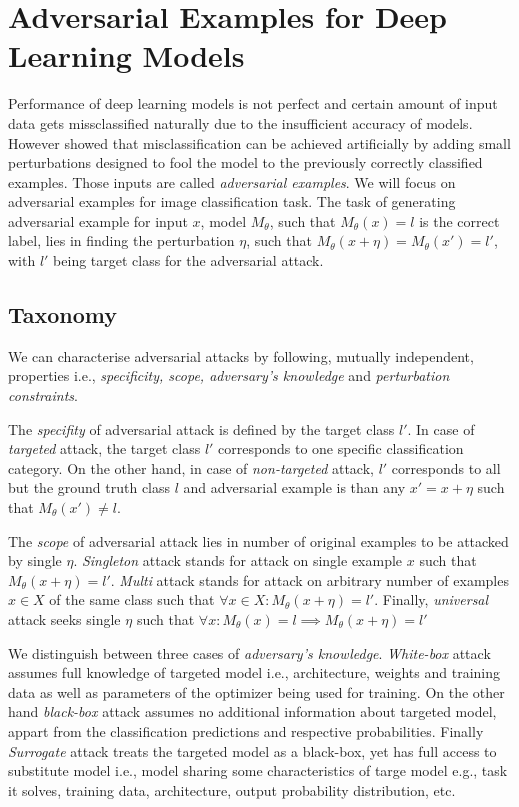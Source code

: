 \chapter{Adversarial Examples for Deep Learning Models}
\label{sec:advex}
Performance of deep learning models is not perfect and certain amount of input data gets missclassified naturally due to the insufficient accuracy of models. However \cite{DBLP:journals/corr/SzegedyZSBEGF13} showed that misclassification can be achieved artificially by adding small perturbations designed to fool the model to the previously correctly classified examples. Those inputs are called \emph{adversarial examples}. We will focus on adversarial examples for image classification task.
The task of generating adversarial example for input $x$, model $M_\theta$, such that $M_\theta(x) = l$ is the correct label, lies in finding the perturbation $\eta$, such that $M_\theta(x + \eta) = M_\theta(x') = l'$, with $l'$ being target class for the adversarial attack.

\section{Taxonomy}
\label{sec:advex_taxonomy}
We can characterise adversarial attacks by following, mutually independent, properties i.e., \emph{specificity, scope, adversary's knowledge} and \emph{perturbation constraints}.

The \emph{specifity} of adversarial attack is defined by the target class $l'$. In case of \emph{targeted} attack, the target class $l'$ corresponds to one specific classification category. On the other hand, in case of \emph{non-targeted} attack, $l'$ corresponds to all but the ground truth class $l$ and adversarial example is than any $x' = x + \eta$ such that $M_\theta(x') \neq l$.

The \emph{scope} of adversarial attack lies in number of original examples to be attacked by single $\eta$. \emph{Singleton} attack stands for attack on single example $x$ such that $M_\theta(x + \eta) = l'$. \emph{Multi} attack stands for attack on arbitrary number of examples  $x \in X$ of the same class such that $\forall x \in X: M_\theta(x + \eta) = l'$. Finally, \emph{universal} attack seeks single $\eta$ such that $\forall x: M_\theta(x) = l \implies M_\theta(x + \eta) = l'$

We distinguish between three cases of \emph{adversary's knowledge}. \emph{White-box} attack assumes full knowledge of targeted model i.e., architecture, weights and training data as well as parameters of the optimizer being used for training. On the other hand \emph{black-box} attack assumes no additional information about targeted model, appart from the classification predictions and respective probabilities. Finally \emph{Surrogate} attack treats the targeted model as a black-box, yet has full access to substitute model i.e., model sharing some characteristics of targe model e.g., task it solves, training data, architecture, output probability distribution, etc.

